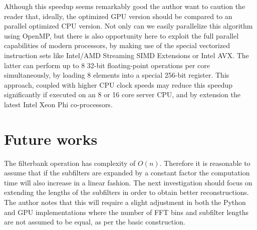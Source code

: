\documentclass[a4paper,10pt]{article}
\begin{document}
Although this speedup seems remarkably good the author want to caution the reader that, ideally, the optimized GPU version should be compared to an parallel optimized CPU
version. Not only can we easily parallelize this algorithm using OpenMP, but there is also opportunity here to exploit the full parallel capabilities of modern processors,
by making use of the special vectorized instruction sets like Intel/AMD Streaming SIMD Extensions or Intel AVX. The latter can perform up to 8 32-bit floating-point
operations per core simultaneously, by loading 8 elements into a special 256-bit register. This approach, coupled with higher CPU clock speeds may reduce this speedup 
significantly if executed on an 8 or 16 core server CPU, and by extension the latest Intel Xeon Phi co-processors.

\section{Future works}
The filterbank operation has complexity of $O(n)$. Therefore it is reasonable to assume that if the subfilters are expanded by a constant factor the computation time will also 
increase in a linear fashion. The next investigation should focus on extending the lengths of the subfilters in order to obtain better reconstructions. The author notes that
this will require a slight adjustment in both the Python and GPU implementations where the number of FFT bins and subfilter lengths are not assumed to be equal, as per the basic
construction.
\pagebreak
{}

\end{document}
